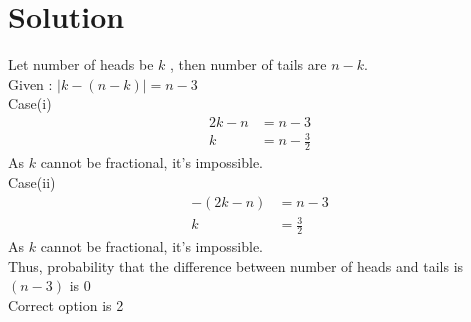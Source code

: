 \section{Solution}
Let number of heads be $k$ , then number of tails are $n-k$.\\
Given : $|k-(n-k)|= n-3$\\
Case(i) \begin{align*}
    2k-n &= n-3 \\
    k &= n- \frac{3}{2}
\end{align*}
As $k$ cannot be fractional, it's impossible.\\
Case(ii) \begin{align*}
    -(2k-n) &= n-3 \\
    k &= \frac{3}{2}
\end{align*}
As $k$ cannot be fractional, it's impossible.\\
Thus, probability that the difference between number of heads and tails is $(n-3)$ is 0\\
Correct option is 2
